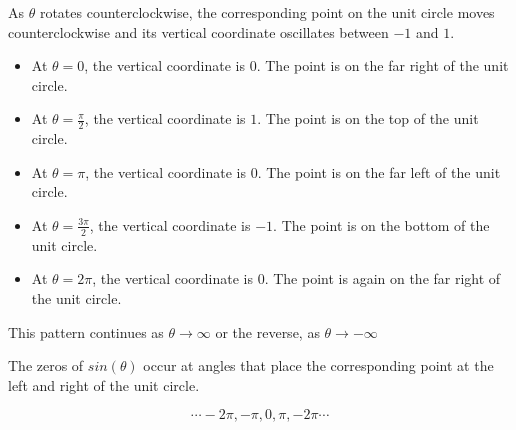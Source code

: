 \documentclass{ximera}
\begin{document}
\begin{image}
\end{image}



As $\theta$ rotates counterclockwise, the corresponding point on the unit circle moves counterclockwise and its vertical coordinate oscillates between $-1$ and $1$.

\begin{itemize}
\item At $\theta = 0$, the vertical coordinate is $0$. The point is on the far right of the unit circle.
\item At $\theta = \frac{\pi}{2}$, the vertical coordinate is $1$. The point is on the top of the unit circle.
\item At $\theta = \pi$, the vertical coordinate is $0$. The point is on the far left of the unit circle.
\item At $\theta = \frac{3\pi}{2}$, the vertical coordinate is $-1$. The point is on the bottom of the unit circle.
\item At $\theta = 2\pi$, the vertical coordinate is $0$. The point is again on the far right of the unit circle.
\end{itemize}


This pattern continues as $\theta \rightarrow \infty$ or the reverse, as $\theta \rightarrow -\infty$

The zeros of $sin(\theta)$ occur at angles that place the corresponding point at the left and right of the unit circle.  


\[     \cdots -2\pi, -\pi, 0, \pi, -2\pi \cdots \]
\end{document}
